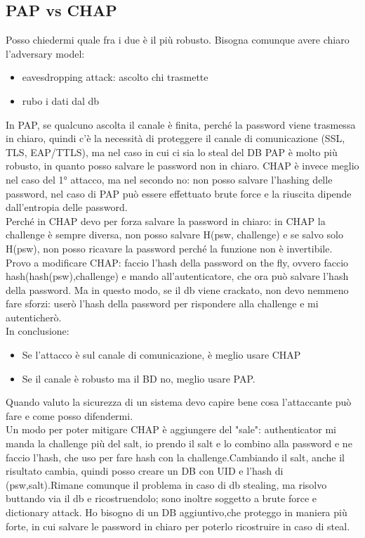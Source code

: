 \documentclass[16px]{article}
\begin{document}
\subsection{PAP vs CHAP}
Posso chiedermi quale fra i due è il più robusto. Bisogna comunque avere chiaro l'adversary model:
\begin{itemize}
\item eavesdropping attack: ascolto chi trasmette
\item rubo i dati dal db
\end{itemize}
In PAP, se qualcuno ascolta il canale è finita, perché la password viene trasmessa in chiaro, quindi c'è la necessità di proteggere il canale di comunicazione (SSL, TLS, EAP/TTLS), ma nel caso in cui ci sia lo steal del DB PAP è molto più robusto, in quanto posso salvare le password non in chiaro. CHAP è invece meglio nel caso del 1° attacco, ma nel secondo no: non posso salvare l'hashing delle password, nel caso di PAP può essere effettuato brute force e la riuscita dipende dall'entropia delle password.\\ Perché in CHAP devo per forza salvare la password in chiaro: in CHAP la challenge è sempre diversa, non posso salvare H(psw, challenge) e se salvo solo H(psw),  non posso ricavare la password perché la funzione non è invertibile.\\ Provo a modificare CHAP: faccio l'hash della password on the fly, ovvero faccio hash(hash(psw),challenge) e mando all'autenticatore, che ora può salvare l'hash della password. Ma in questo modo, se il db viene crackato, non devo nemmeno fare sforzi: userò l'hash della password per rispondere alla challenge e mi autenticherò.\\ In conclusione: 
\begin{itemize}
\item Se l'attacco è sul canale di comunicazione, è meglio usare CHAP
\item Se il canale è robusto ma il BD no, meglio usare PAP.
\end{itemize}
Quando valuto la sicurezza di un sistema devo capire bene cosa l'attaccante può fare e come posso difendermi.\\ Un modo per poter mitigare CHAP è aggiungere del "sale": authenticator mi manda la challenge più del salt, io prendo il salt e lo combino alla password e ne faccio l'hash, che uso per fare hash con la challenge.Cambiando il salt, anche il risultato cambia, quindi posso creare un DB con UID e l'hash di (psw,salt).Rimane comunque il problema in caso di db stealing, ma risolvo buttando via il db e ricostruendolo; sono inoltre soggetto a brute force e dictionary attack. Ho bisogno di un DB aggiuntivo,che proteggo in maniera più forte, in cui salvare le password in chiaro per poterlo ricostruire in caso di steal.
\end{document}
